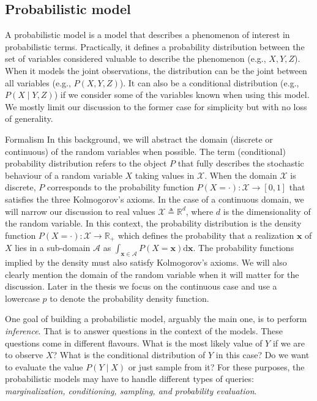 \subsection{Probabilistic model}
A probabilistic model is a model that describes a phenomenon of interest in probabilistic terms. Practically, it defines a probability distribution between the set of variables considered valuable to describe the phenomenon (e.g., $X, Y, Z$). When it models the joint observations, the distribution can be the joint between all variables (e.g., $P(X, Y, Z)$). It can also be a conditional distribution  (e.g., $P(X \mid Y, Z)$) if we consider some of the variables known when using this model. We mostly limit our discussion to the former case for simplicity but with no loss of generality.

\begin{side_note}{Formalism}
  In this background, we will abstract the domain (discrete or continuous) of the random variables when possible. The term (conditional) probability distribution refers to the object $P$ that fully describes the stochastic behaviour of a random variable $X$ taking values in $\mathcal{X}$. When the domain $\mathcal{X}$ is discrete, $P$ corresponds to the probability function $P(X=\cdot): \mathcal{X} \rightarrow \left[0, 1 \right]$ that satisfies the three Kolmogorov's axioms. In the case of a continuous domain, we will narrow our discussion to real values $\mathcal{X} \triangleq \mathbb{R}^d$, where $d$ is the dimensionality of the random variable. In this context, the probability distribution is the density function $P(X=\cdot): \mathcal{X} \rightarrow \mathbb{R}_{+}$ which defines the probability that a realization $\bm{x}$ of $X$ lies in a sub-domain $\mathcal{A}$ as $\int_{\bm{x} \in \mathcal{A}} P(X=\bm{x}) \text{d} \bm{x}$. The probability functions implied by the density must also satisfy Kolmogorov's axioms. We will also clearly mention the domain of the random variable when it will matter for the discussion. Later in the thesis we focus on the continuous case and use a lowercase $p$ to denote the probability density function.
\end{side_note}

One goal of building a probabilistic model, arguably the main one, is to perform \textit{inference}. That is to answer questions in the context of the models. These questions come in different flavours. What is the most likely value of $Y$ if we are to observe $X$? What is the conditional distribution of $Y$ in this case? Do we want to evaluate the value $P(Y \mid X)$ or just sample from it? For these purposes, the probabilistic models may have to handle different types of queries: \textit{marginalization, conditioning, sampling, and probability evaluation}.

